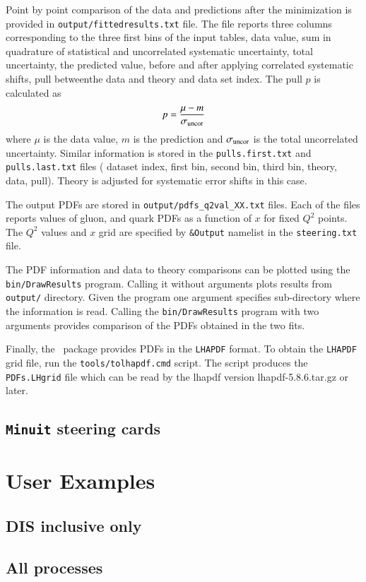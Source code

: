   Point by point comparison of the data and predictions after the minimization 
  is provided in {\tt output/fittedresults.txt} file. The file reports three columns
  corresponding to the three first bins of the input tables, data value, sum in 
  quadrature of statistical and uncorrelated systematic uncertainty, total
  uncertainty, the predicted value, before and after applying correlated systematic shifts,
  pull betweenthe  data and theory and 
  data set index. The pull $p$ is calculated as 
  \begin{equation}
      p = \frac{ \mu - m} {\sigma_{\rm uncor}}
  \end{equation}
  where $\mu$ is the data value, $m$ is the prediction and $\sigma_{\rm uncor}$ is the total
  uncorrelated uncertainty.
  Similar information is stored in the {\tt pulls.first.txt} and {\tt pulls.last.txt} files
  ( dataset index, first bin, second bin, third bin, theory, data, pull).
  Theory is  adjusted for systematic error shifts in this case.

  The output PDFs are stored in  {\tt output/pdfs\_q2val\_XX.txt} files.
  Each of the files reports values of gluon, and quark PDFs as a function of $x$
  for fixed $Q^2$ points. The $Q^2$ values and $x$ grid are specified by 
  {\tt \&Output} namelist in the {\tt steering.txt} file.
  
  The PDF information and data to theory comparisons can be plotted using 
  the {\tt bin/DrawResults} program.  Calling it without arguments plots results from
  {\tt output/} directory. Given the program one argument specifies sub-directory 
  where the information is read. Calling the {\tt bin/DrawResults} program with two
  arguments provides comparison of the PDFs obtained in the two fits.
  
  Finally, the \fitter\ package provides PDFs in the {\tt LHAPDF} format. To obtain the
  {\tt LHAPDF} grid file, run the {\tt tools/tolhapdf.cmd} script. The script produces 
  the {\tt PDFs.LHgrid} file which can be read by the lhapdf version lhapdf-5.8.6.tar.gz
  or later.
\subsection{{\tt Minuit} steering cards}

\section{User Examples}
\subsection{DIS inclusive only}

\subsection{All processes}

